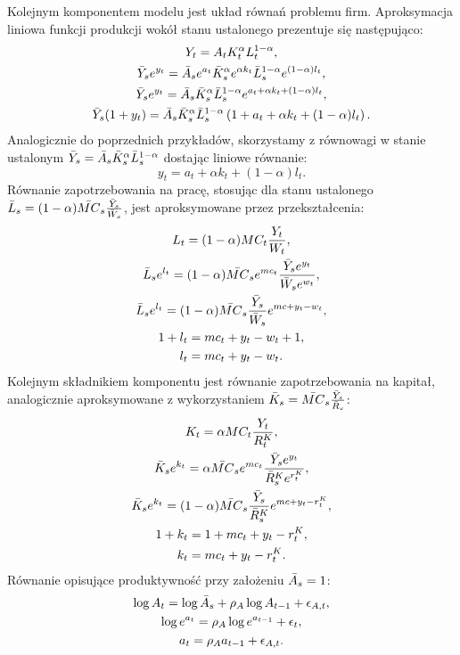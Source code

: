 Kolejnym komponentem modelu jest układ równań problemu firm. Aproksymacja liniowa funkcji produkcji wokół stanu ustalonego prezentuje się następująco:
\begin{gather}
    Y_t = A_t K_t^\alpha L_t^{1-\alpha}, \\
    \bar{Y}_s e^{y_t} = \bar{A}_s e^{a_t} \bar{K}_s^\alpha e^{\alpha k_t} \bar{L}_s^{1-\alpha} e^{(1-\alpha) l_t}, \\
    \bar{Y}_s e^{y_t} = \bar{A}_s \bar{K}_s^\alpha \bar{L}_s^{1-\alpha} e^{a_t + \alpha k_t + (1-\alpha)l_t}, \\ 
    \bar{Y}_s (1 + y_t) = \bar{A}_s \bar{K}_s^\alpha \bar{L}_s^{1-\alpha} \left( 1+ a_t + \alpha k_t + (1-\alpha)l_t \right).
\end{gather}
Analogicznie do poprzednich przykładów, skorzystamy z równowagi w stanie ustalonym $\bar{Y}_s = \bar{A}_s \bar{K}_s^\alpha \bar{L}_s^{1-\alpha}$ dostając liniowe równanie:
\begin{equation}
    y_t = a_t + \alpha k_t + (1-\alpha) l_t.
\end{equation}
Równanie zapotrzebowania na pracę, stosując dla stanu ustalonego $\bar{L}_s = (1-\alpha) \bar{MC}_s \frac{\bar{Y}_s}{\bar{W}_s}$, jest aproksymowane przez przekształcenia:
\begin{gather}
    L_t = (1 - \alpha)MC_t \frac{Y_t}{W_t}, \\
    \bar{L}_s e^{l_t} = (1-\alpha) \bar{MC}_s e^{mc_t} \frac{\bar{Y}_s e^{y_t}}{\bar{W}_s e^{w_t}}, \\
    \bar{L}_s e^{l_t} = (1-\alpha) \bar{MC}_s  \frac{\bar{Y}_s}{\bar{W}_s} e^{mc + y_t - w_t}, \\
    1 + l_t = mc_t + y_t - w_t + 1, \\ 
    l_t = mc_t + y_t - w_t.
\end{gather}
Kolejnym składnikiem komponentu jest równanie zapotrzebowania na kapitał, analogicznie aproksymowane z wykorzystaniem $\bar{K}_s = \bar{MC}_s \frac{\bar{Y}_s}{\bar{R}_s}$:
\begin{gather}
    K_t = \alpha MC_t \frac{Y_t}{R^K_t}, \\
    \bar{K}_s e^{k_t} = \alpha \bar{MC}_s e^{mc_t} \frac{\bar{Y}_s e^{y_t}}{\bar{R}_s^K e^{r^K_t}}, \\
    \bar{K}_s e^{k_t} = (1-\alpha) \bar{MC}_s  \frac{\bar{Y}_s}{\bar{R}_s^K} e^{mc + y_t - r^K_t}, \\
    1 + k_t = 1+ mc_t + y_t - r^K_t, \\
    k_t = mc_t + y_t - r^K_t.
\end{gather}
Równanie opisujące produktywność przy założeniu $\bar{A}_s = 1$:
\begin{gather}
    \log A_t = \log \bar{A}_s + \rho_A \log A_{t-1} + \epsilon_{A,t}, \\
    \log e^{a_t} = \rho_A \log e^{a_{t-1}} + \epsilon_t, \\
    a_t = \rho_A a_{t-1} + \epsilon_{A,t}.
\end{gather}

